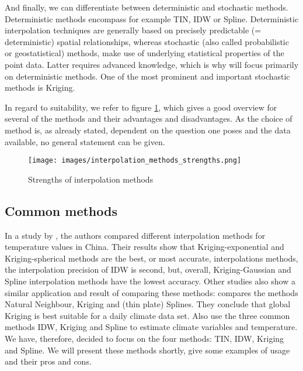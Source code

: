 And finally, we can differentiate between deterministic and stochastic methods.\cite{gitta_raumliche_2016}
Deterministic methods encompass for example \ldq{}TIN\rdq{}, \ldq{}IDW\rdq{} or \ldq{}Spline\rdq{}. \cite{wasser_going_2020} Deterministic interpolation techniques are generally based on precisely predictable (= deterministic) spatial relationships, whereas stochastic (also called probabilistic or geostatistical) methods, make use of underlying statistical properties of the point data. Latter requires advanced knowledge, which is why will focus primarily on deterministic methods. One of the most prominent and important stochastic methods is Kriging.

In regard to suitability, we refer to figure \ref{fig:interpolation_methods_strengths}, which gives a good overview for several of the methods and their advantages and disadvantages. As the choice of method is, as already stated, dependent on the question one poses and the data available, no general statement can be given.


\begin{figure}[b!]
	\texttt{[image: images/interpolation\_methods\_strengths.png]}
	\caption{Strengths of interpolation methods \cite{wasser_going_2020}}
	\label{fig:interpolation_methods_strengths}
\end{figure}

\subsection{Common methods}

In a study by \citeauthor{wenjing_cao_study_2009}, the authors compared different interpolation methods for temperature values in China. Their results show that Kriging-exponential and Kriging-spherical methods are the best, or most accurate, interpolations methods, the interpolation precision of IDW is second, but, overall, Kriging-Gaussian and Spline interpolation methods have the lowest accuracy. \cite{wenjing_cao_study_2009} Other studies also show a similar application and result of comparing these methods: 
\citeauthor{hofstra_comparison_2008} compares the methods Natural Neighbour, Kriging and (thin plate) Splines. They conclude that global Kriging is best suitable for a daily climate data set. Also \citeauthor{samanta_interpolation_2012} use the three common methods IDW, Kriging and Spline to estimate climate variables and temperature.
We have, therefore, decided to focus on the four methods: TIN, IDW, Kriging and Spline. We will present these methods shortly, give some examples of usage and their pros and cons.

